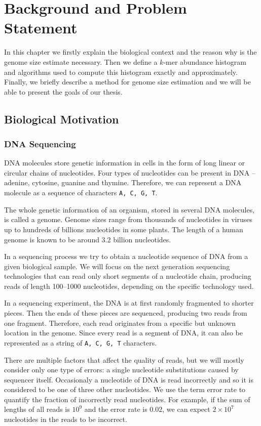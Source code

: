 \chapter{Background and Problem Statement}
In this chapter we firstly explain the biological context and the reason why is 
the genome size estimate necessary. Then we define a $k$-mer abundance histogram
and algorithms used to compute this histogram exactly and approximately.
Finally, we briefly describe a method for genome size estimation and we will be
able to present the goals of our thesis.

\section{Biological Motivation}

\subsection{DNA Sequencing}
\label{sec:sequencing}

DNA molecules store genetic information in cells in the form of long linear or circular chains
of nucleotides. Four types of nucleotides can be present in DNA -- adenine, cytosine, guanine
and thymine. Therefore, we can represent a DNA molecule as a sequence of characters
\texttt{A, C, G, T}.

The whole genetic information of an organism, stored in several DNA molecules, is called a genome.
Genome sizes range from thousands of nucleotides in viruses up to hundreds of billions
nucleotides in some plants. The length of a human genome is known to be around
3.2 billion nucleotides.

In a sequencing process we try to obtain a nucleotide sequence of DNA from
a given biological sample. We will focus on the next generation sequencing technologies
that can read only short segments of a nucleotide chain, producing reads of length 100--1000
nucleotides, depending on the specific technology used.

In a sequencing experiment, the DNA is at first randomly fragmented to shorter pieces.
Then the ends of these pieces are sequenced, producing two reads from one fragment. 
Therefore, each read originates from a specific but unknown location in the genome. 
Since every read is a segment of DNA, it can also be represented as a string of
\texttt{A, C, G, T} characters.

There are multiple factors that affect the quality of reads, but we will mostly consider only
one type of errors: a single nucleotide substitutions caused by sequencer itself. Occasionaly
a nucleotide of DNA is read incorrectly and so it is considered to be one of three
other nucleotides. We use the term error rate to quantify the fraction of incorrectly
read nucleotides. For example, if the sum of lengths of all reads is $10^9$ and the error
rate is $0.02$, we can expect $2 \times 10^7$ nucleotides in the reads to be incorrect.

